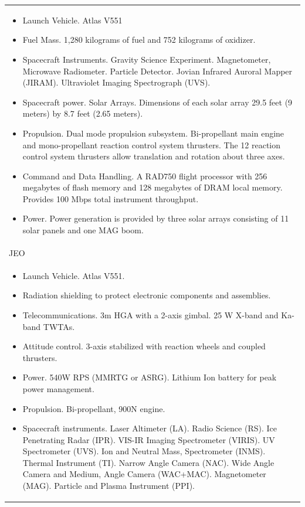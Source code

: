 \begin{longtable}{p{\textwidth}}
  \begin{itemize}
  \item Launch Vehicle. Atlas V551
  \item Fuel Mass. 1,280 kilograms of fuel and 752 kilograms of
    oxidizer.
  \item Spacecraft Instruments. Gravity Science Experiment.
    Magnetometer, Microwave Radiometer. Particle Detector. Jovian
    Infrared Auroral Mapper (JIRAM). Ultraviolet Imaging Spectrograph
    (UVS).
  \item Spacecraft power. Solar Arrays. Dimensions of each solar array
    29.5 feet (9 meters) by 8.7 feet (2.65 meters).
  \item Propulsion. Dual mode propulsion subsystem. Bi-propellant main
    engine and mono-propellant reaction control system thrusters. The
    12 reaction control system thrusters allow translation and
    rotation about three axes.
  \item Command and Data Handling. A RAD750 flight processor with 256
    megabytes of flash memory and 128 megabytes of DRAM local
    memory. Provides 100 Mbps total instrument throughput.
  \item Power. Power generation is provided by three solar arrays
    consisting of 11 solar panels and one MAG boom.
  \end{itemize} \\

  JEO \\* \midrule

  \begin{itemize}
  \item Launch Vehicle. Atlas V551.
  \item Radiation shielding to protect electronic components and
    assemblies.
  \item Telecommunications. 3m HGA with a 2-axis gimbal. 25 W X-band
    and Ka-band TWTAs.
  \item Attitude control. 3-axis stabilized with reaction wheels and
    coupled thrusters.
  \item Power. 540W RPS (MMRTG or ASRG). Lithium Ion battery for peak
    power management.
  \item Propulsion. Bi-propellant, 900N engine.
  \item Spacecraft instruments. Laser Altimeter (LA). Radio Science
    (RS). Ice Penetrating Radar (IPR).  VIS-IR Imaging Spectrometer
    (VIRIS).  UV Spectrometer (UVS).  Ion and Neutral Mass,
    Spectrometer (INMS).  Thermal Instrument (TI).  Narrow Angle
    Camera (NAC).  Wide Angle Camera and Medium, Angle Camera
    (WAC+MAC).  Magnetometer (MAG).  Particle and Plasma Instrument
    (PPI).
  \end{itemize} \\


\end{longtable}
